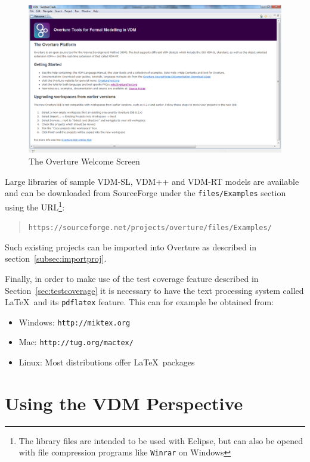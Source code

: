 \documentclass{overturerepchap}
\newcommand{\url}[1]{\texttt{#1}}
\begin{document}
\begin{figure}[!htb]
\begin{center}
  \includegraphics[width=\textwidth]{screenDumps/welcomeWindow}
  \caption{The Overture Welcome Screen}
  \label{fig:userguire:welcomeWindow}
\end{center}
\end{figure}

Large libraries of sample VDM-SL, VDM++ and VDM-RT models are available
and can be downloaded from SourceForge under the
\texttt{files/Examples} section using the URL\footnote{The library
  files are intended to be used with Eclipse, but can also be opened with
  file compression programs like \texttt{Winrar} on Windows}:
\begin{quote}
\url{https://sourceforge.net/projects/overture/files/Examples/}
\end{quote}
Such existing projects can be imported into Overture as described in
section~\ref{subsec:importproj}.

Finally, in order to make use of the
test coverage feature described in Section~\ref{sec:testcoverage} it is
necessary to have the text processing system called \LaTeX\ and its
\texttt{pdflatex} feature. This can for example be obtained from:

\begin{itemize}
    \item Windows: \url{http://miktex.org}
    \item Mac: \url{http://tug.org/mactex/}
    \item Linux: Most distributions offer \LaTeX\ packages
\end{itemize}

\chapter{Using the VDM Perspective}\label{sec:vdmsupport}
\end{document}
